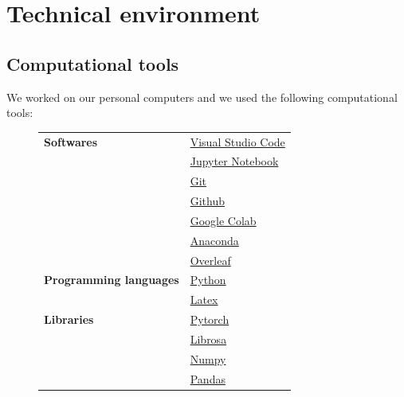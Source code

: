 \documentclass[11pt]{article}
\begin{document}
\pagebreak

\section{Technical environment}

\subsection{Computational tools}

We worked on our personal computers and we used the following computational tools:


\begin{figure}[h]
  \begin{center}
    \begin{tabularx}{\textwidth}{|X|X|}
      \hline
      \textbf{Softwares}  & \href{https://code.visualstudio.com/}{Visual Studio Code}     \\
                          & \href{https://jupyter.org/}{Jupyter Notebook}                 \\
                          & \href{https://git-scm.com/}{Git}                              \\
                          & \href{https://github.com/}{Github}                            \\
                          & \href{https://colab.research.google.com/}{Google Colab}       \\
                          & \href{https://www.anaconda.com/products/individual}{Anaconda} \\
                          & \href{https://www.overleaf.com/}{Overleaf}                    \\
      \hline
      \textbf{Programming languages}
                          & \href{https://www.python.org/}{Python}                        \\
                          & \href{https://www.latex-project.org/}{Latex}                  \\
      \hline
      \textbf{Libraries}  & \href{https://pytorch.org/}{Pytorch}                          \\
                          & \href{https://librosa.org/doc/latest/index.html}{Librosa}     \\
                          & \href{https://numpy.org/}{Numpy}                              \\
                          & \href{https://pandas.pydata.org/}{Pandas}                     \\

\end{tabularx}
\end{center}
\end{figure}
\end{document}
